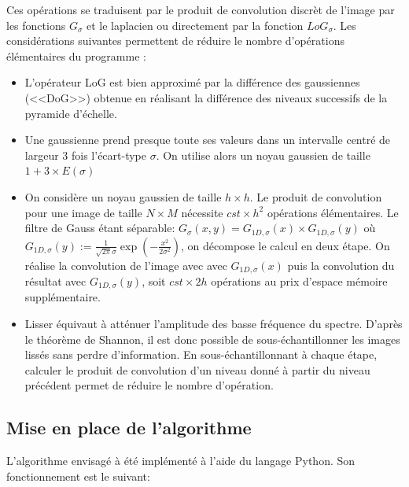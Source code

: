 \documentclass{article}
\begin{document}
	Ces opérations se traduisent par le produit de convolution discrèt de l'image par les fonctions $G_{\sigma}$ et le laplacien ou directement par la fonction ${LoG}_{\sigma}$. Les considérations suivantes permettent de réduire le nombre d'opérations élémentaires du programme : 
	\begin{itemize}
		\item L'opérateur LoG est bien approximé par la différence des gaussiennes (<<DoG>>) obtenue en réalisant la différence des niveaux successifs de la pyramide d'échelle.
		\item Une gaussienne prend presque toute ses valeurs dans un intervalle centré de largeur 3 fois l'écart-type $\sigma$. On utilise alors un noyau gaussien de taille $1 + 3 \times E(\sigma)$
		\item On considère un noyau gaussien de taille $h \times h$. Le produit de convolution pour une image de taille $N \times M$ nécessite $cst \times h^{2}$ opérations élémentaires. Le filtre de Gauss étant séparable: $G_{\sigma}(x,y)=G_{1D, \sigma}(x) \times G_{1D, \sigma}(y)$ o\`{u} $G_{1D, \sigma}(y) := \frac{1}{\sqrt{2\pi}\sigma}\exp(-\frac{x^{2}}{2\sigma^{2}})$, on décompose le calcul en deux étape. On réalise la convolution de l'image avec avec $G_{1D, \sigma}(x)$ puis la convolution du résultat avec $G_{1D, \sigma}(y)$, soit $cst \times 2h$ opérations au prix d'espace mémoire supplémentaire.
		\item Lisser équivaut à atténuer l'amplitude des basse fréquence du spectre. D'après le théorème de Shannon, il est donc possible de sous-échantillonner les images lissés sans perdre d'information. En sous-échantillonnant à chaque étape, calculer le produit de convolution d'un niveau donné à partir du niveau précédent permet de réduire le nombre d'opération.
	\end{itemize}

	\subsection{Mise en place de l'algorithme}

	L'algorithme envisagé à été implémenté à l'aide du langage Python. Son fonctionnement est le suivant:
\end{document}
